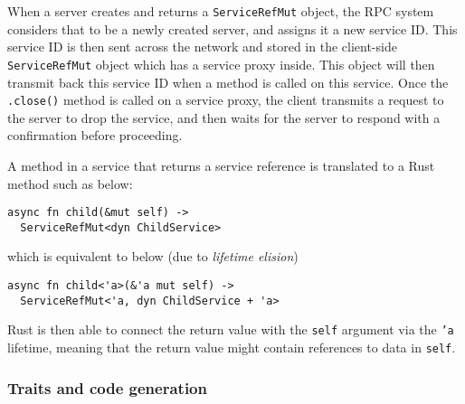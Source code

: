 \documentclass[11pt, twocolumn]{article}
\begin{document}
When a server creates and returns a \texttt{ServiceRefMut} object, the RPC system considers that to be a newly created server, and assigns it a new service ID. This service ID is then sent across the network and stored in the client-side \texttt{ServiceRefMut} object which has a service proxy inside. This object will then transmit back this service ID when a method is called on this service. Once the \texttt{.close()} method is called on a service proxy, the client transmits a request to the server to drop the service, and then waits for the server to respond with a confirmation before proceeding.

A method in a service that returns a service reference is translated to a Rust method such as below:
\begin{verbatim}
async fn child(&mut self) ->
  ServiceRefMut<dyn ChildService>
\end{verbatim}
\noindent which is equivalent to below (due to \textit{lifetime elision})
\begin{verbatim}
async fn child<'a>(&'a mut self) ->
  ServiceRefMut<'a, dyn ChildService + 'a>
\end{verbatim}
\noindent Rust is then able to connect the return value with the \texttt{self} argument via the \texttt{'a} lifetime, meaning that the return value might contain references to data in \texttt{self}.

\subsubsection{Traits and code generation} \label{sec:impl:types}
\end{document}
